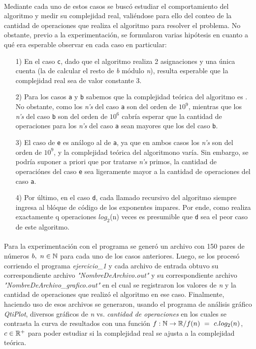 \paragraph{}
Mediante cada uno de estos casos se buscó estudiar el comportamiento del algoritmo y medir su complejidad real, valiéndose para ello del conteo de la cantidad de operaciones que realiza el algoritmo para resolver el problema. No obstante, previo a la experimentación, se formularon varias hipótesis en cuanto a qué era esperable observar en cada caso en particular:
	\begin{itemize}
		\item[1)]{En el caso \texttt{c}, dado que el algoritmo realiza 2 asignaciones y una única cuenta (la de calcular el resto de \textit{b} módulo \textit{n}), resulta esperable que la complejidad real sea de valor constante 3.}
		\item[2)]{Para los casos \texttt{a} y \texttt{b} sabemos que la complejidad teórica del algoritmo es . No obstante, como los \textit{n's} del caso \texttt{a} son del orden de $10^9$, mientras que los \textit{n's} del caso \texttt{b} son del orden de $10^6$ cabría esperar que la cantidad de operaciones para los \textit{n's} del caso \texttt{a} sean mayores que los del caso \texttt{b}}. 
		\item[3)]{El caso de \texttt{e} es análogo al de \texttt{a}, ya que en ambos casos los \textit{n's} son del orden de $10^9$, y la complejidad teórica del algoritmono varía. Sin embargo, se podría suponer a priori que por tratarse \textit{n's} primos, la cantidad de operaciónes del caso \texttt{e} sea ligeramente mayor a la cantidad de operaciones del caso \texttt{a}.}
		\item[4)]{Por último, en el caso \texttt{d}, cada llamado recursivo del algoritmo siempre ingresa al blóque de código de los exponentes impares. Por ende, como realiza exactamente q operaciones $log_2$(n) veces es presumible que \texttt{d} sea el peor caso de este algoritmo.}
	\end{itemize}

\paragraph{}
Para la experimentación con el programa se generó un archivo con 150 pares de números $b,\ n \in \mathbb{N}$ para cada uno de los casos anteriores. Luego, se los procesó corriendo el programa \textit{ejercicio\_1} y cada archivo de entrada obtuvo su correspondiente archivo \textit{"NombreDeArchivo.out"} y su correspondiente archivo \textit{"NombreDeArchivo\_grafico.out"} en el cual se registraron los valores de \textit{n} y la cantidad de operaciones que realizó el algoritmo en ese caso. Finalmente, haciendo uso de esos archivos se generaron, usando el programa de análisis gráfico \textit{QtiPlot}, diversos gráficos de \textit{n} vs. \textit{cantidad de operaciones} en los cuales se contrasta la curva de resultados con una función $f: \mathbb{N} \rightarrow \mathbb{R} / f(n)\ =\ c.log_2(n)$, $c \in \mathbb{R}^+$ para poder estudiar si la complejidad real se ajusta a la complejidad teórica.\\

